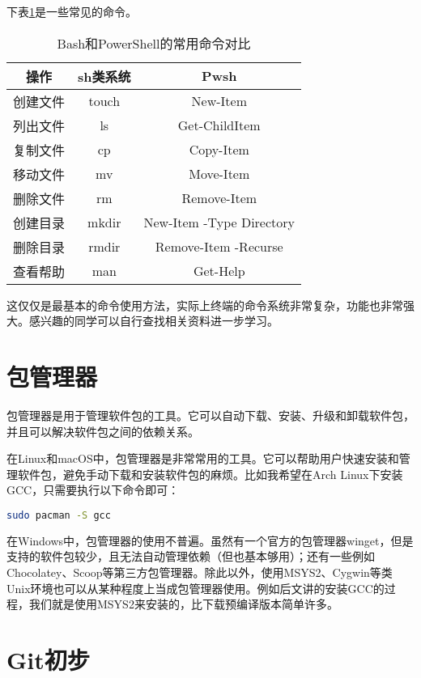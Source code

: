 \documentclass[../main.tex]{subfiles}
\begin{document}
下表\ref{tab:terminal-commands}是一些常见的命令。

\begin{table}[htbp]
  \centering
  \begin{tabular}{c|cc}
    \hline
    \textbf{操作} & \textbf{\*sh类系统} & \textbf{Pwsh} \\
    \hline
    创建文件 & touch & New-Item \\
    列出文件 & ls & Get-ChildItem \\
    复制文件 & cp & Copy-Item \\
    移动文件 & mv & Move-Item \\
    删除文件 & rm & Remove-Item \\
    创建目录 & mkdir & New-Item -Type Directory \\
    删除目录 & rmdir & Remove-Item -Recurse \\
    查看帮助 & man & Get-Help \\
    \hline
  \end{tabular}
  \caption{Bash和PowerShell的常用命令对比}
  \label{tab:terminal-commands}
\end{table}

这仅仅是最基本的命令使用方法，实际上终端的命令系统非常复杂，功能也非常强大。感兴趣的同学可以自行查找相关资料进一步学习。

\section{包管理器}

包管理器是用于管理软件包的工具。它可以自动下载、安装、升级和卸载软件包，并且可以解决软件包之间的依赖关系。

在Linux和macOS中，包管理器是非常常用的工具。它可以帮助用户快速安装和管理软件包，避免手动下载和安装软件包的麻烦。比如我希望在Arch Linux下安装GCC，只需要执行以下命令即可：

\begin{lstlisting}[language=bash]
    sudo pacman -S gcc
\end{lstlisting}

在Windows中，包管理器的使用不普遍。虽然有一个官方的包管理器winget，但是支持的软件包较少，且无法自动管理依赖（但也基本够用）；还有一些例如Chocolatey、Scoop等第三方包管理器。除此以外，使用MSYS2、Cygwin等类Unix环境也可以从某种程度上当成包管理器使用。例如后文讲的安装GCC的过程，我们就是使用MSYS2来安装的，比下载预编译版本简单许多。

\section{Git初步}\label{sec:git}
\end{document}
